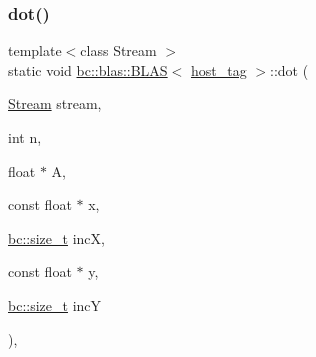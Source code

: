 \mbox{\label{structbc_1_1blas_1_1BLAS_3_01host__tag_01_4_a9e497c6a7b2588a5451c5f2492282392}} 
\subsubsection{\texorpdfstring{dot()}{dot()}\hspace{0.1cm}{\footnotesize\ttfamily [2/2]}}
{\footnotesize\ttfamily template$<$class Stream $>$ \\
static void \hyperlink{structbc_1_1blas_1_1BLAS}{bc\+::blas\+::\+B\+L\+AS}$<$ \hyperlink{structbc_1_1host__tag}{host\+\_\+tag} $>$\+::dot (\begin{DoxyParamCaption}\item[{\hyperlink{classbc_1_1streams_1_1Stream}{Stream}}]{stream,  }\item[{int}]{n,  }\item[{float $\ast$}]{A,  }\item[{const float $\ast$}]{x,  }\item[{\hyperlink{namespacebc_aaf8e3fbf99b04b1b57c4f80c6f55d3c5}{bc\+::size\+\_\+t}}]{incX,  }\item[{const float $\ast$}]{y,  }\item[{\hyperlink{namespacebc_aaf8e3fbf99b04b1b57c4f80c6f55d3c5}{bc\+::size\+\_\+t}}]{incY }\end{DoxyParamCaption})\hspace{0.3cm}{\ttfamily [inline]}, {\ttfamily [static]}}

\mbox{\label{structbc_1_1blas_1_1BLAS_3_01host__tag_01_4_a3a1d3f4f95612d92c0b9887df3afb3f4}} 
